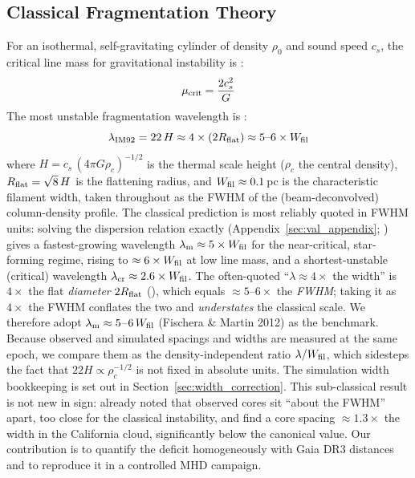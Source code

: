 \documentclass[usenatbib,twoside,twocolumn]{mnras}
\begin{document}
\subsection{Classical Fragmentation Theory}

For an isothermal, self-gravitating cylinder of density $\rho_0$ and sound speed $c_s$, the critical line mass for gravitational instability is \citep{Ostriker1964}:
\begin{equation}
\mu_{\rm crit} = \frac{2c_s^2}{G}
\end{equation}
The most unstable fragmentation wavelength is \citep{Inutsuka1992}:
\begin{equation}
\lambda_{\rm IM92} = 22\,H \approx 4\times(2R_{\rm flat}) \approx 5\text{--}6\times W_{\rm fil}
\label{eq:im92}
\end{equation}
where $H = c_s\,(4\pi G\rho_c)^{-1/2}$ is the thermal scale height ($\rho_c$ the central density), $R_{\rm flat}=\sqrt8\,H$ is the flattening radius, and $W_{\rm fil}\approx0.1$\,pc is the characteristic filament width, taken throughout as the FWHM of the (beam-deconvolved) column-density profile. The classical prediction is most reliably quoted in FWHM units: solving the dispersion relation exactly (Appendix~\ref{sec:val_appendix}; \citealt{Fischera2012}) gives a fastest-growing wavelength $\lambda_{\rm m}\approx5\times W_{\rm fil}$ for the near-critical, star-forming regime, rising to $\approx6\times W_{\rm fil}$ at low line mass, and a shortest-unstable (critical) wavelength $\lambda_{\rm cr}\approx2.6\times W_{\rm fil}$. The often-quoted ``$\lambda\approx4\times$ the width'' is $4\times$ the flat \emph{diameter} $2R_{\rm flat}$ (\citealt{Inutsuka1992}), which equals $\approx5$--$6\times$ the \emph{FWHM}; taking it as $4\times$ the FWHM conflates the two and \emph{understates} the classical scale. We therefore adopt $\lambda_{\rm m}\approx5$--$6\,W_{\rm fil}$ (Fischera \& Martin 2012) as the benchmark. Because observed and simulated spacings and widths are measured at the same epoch, we compare them as the density-independent ratio $\lambda/W_{\rm fil}$, which sidesteps the fact that $22H\propto\rho_c^{-1/2}$ is not fixed in absolute units. The simulation width bookkeeping is set out in Section~\ref{sec:width_correction}. This sub-classical result is not new in sign: \citet{Fischera2012} already noted that observed cores sit ``about the FWHM'' apart, too close for the classical instability, and \citet{Zhang2023cal} find a core spacing $\approx1.3\times$ the width in the California cloud, significantly below the canonical value. Our contribution is to quantify the deficit homogeneously with Gaia DR3 distances and to reproduce it in a controlled MHD campaign.
\end{document}
